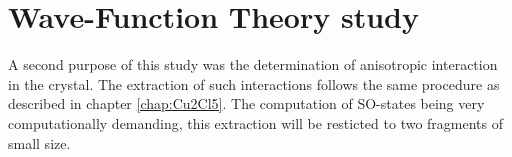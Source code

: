 \documentclass[12pt]{report}
\numberwithin{equation}{section}
\begin{document}



\section{Wave-Function Theory study}

A second purpose of this study was the determination of anisotropic interaction in the crystal.
The extraction of such interactions follows the same procedure as described in chapter \autoref{chap:Cu2Cl5}.
The computation of SO-states being very computationally demanding, this extraction will be resticted to two fragments of small size.
\end{document}
